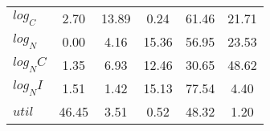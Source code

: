 \begin{center}
\begin{longtable}{lccccc}
$log_C         $	 & 	        2.70	 & 	       13.89	 & 	        0.24	 & 	       61.46	 & 	       21.71 \\ 
$log_N         $	 & 	        0.00	 & 	        4.16	 & 	       15.36	 & 	       56.95	 & 	       23.53 \\ 
$log_NC        $	 & 	        1.35	 & 	        6.93	 & 	       12.46	 & 	       30.65	 & 	       48.62 \\ 
$log_NI        $	 & 	        1.51	 & 	        1.42	 & 	       15.13	 & 	       77.54	 & 	        4.40 \\ 
$util          $	 & 	       46.45	 & 	        3.51	 & 	        0.52	 & 	       48.32	 & 	        1.20 \\ 
\end{longtable}
 \end{center}
